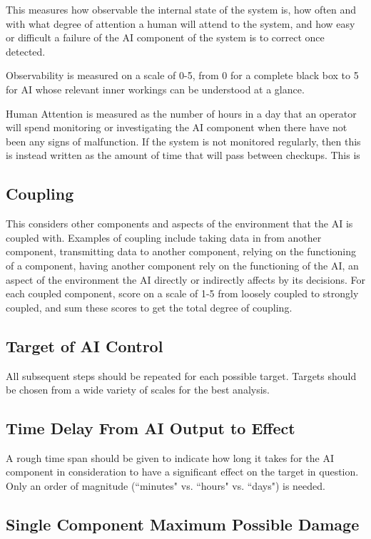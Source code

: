 \documentclass[11pt]{article}
\begin{document}
This measures how observable the internal state of the system is, how often and with what degree of
attention a human will attend to the system, and how easy or difficult a failure of the AI component
of the system is to correct once detected.

Observability is measured on a scale of 0-5, from 0 for a complete black box to 5 for AI whose
relevant inner workings can be understood at a glance.

Human Attention is measured as the number of hours in a day that an operator will spend monitoring
or investigating the AI component when there have not been any signs of malfunction. If the system is
not monitored regularly, then this is instead written as the amount of time that will pass between
checkups. This is

\subsection{Coupling}

This considers other components and aspects of the environment that the AI is coupled with.
Examples of coupling include taking data in from another component, transmitting data to another
component, relying on the functioning of a component, having another component rely on the
functioning of the AI, an aspect of the environment the AI directly or indirectly affects by its
decisions. For each coupled component, score on a scale of 1-5 from loosely coupled to strongly
coupled, and sum these scores to get the total degree of coupling.

\subsection{Target of AI Control}

All subsequent steps should be repeated for each possible target. Targets should be chosen from a
wide variety of scales for the best analysis.

\subsection{Time Delay From AI Output to Effect}

A rough time span should be given to indicate how long it takes for the AI component in
consideration to have a significant effect on the target in question. Only an order of magnitude
(``minutes" vs. ``hours" vs. ``days") is needed.

\subsection{Single Component Maximum Possible Damage}
\end{document}
